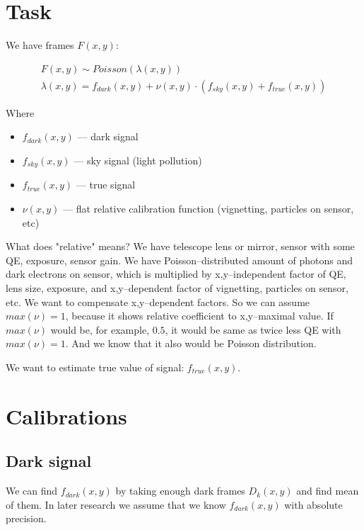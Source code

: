 \documentclass{article}
\begin{document}
\section{Task}

We have frames $F(x,y)$:

\begin{eqnarray}
    F(x,y) \sim Poisson\left( \lambda(x,y) \right) \\
    \lambda(x,y) = f_{dark}(x,y) + \nu(x,y) \cdot \left( f_{sky}(x,y) + f_{true}(x,y) \right)
\end{eqnarray}

Where 
\begin{itemize}
    \item $f_{dark}(x,y)$ --- dark signal
    \item $f_{sky}(x,y)$ --- sky signal (light pollution)
    \item $f_{true}(x,y)$ --- true signal
    \item $\nu(x,y)$ --- flat relative calibration function (vignetting, particles on sensor, etc)
\end{itemize}

What does "relative" means? We have telescope lens or mirror, sensor with some QE, exposure, sensor gain. We have Poisson--distributed amount
of photons and dark electrons on sensor, which is multiplied by x,y--independent factor of QE, lens size, exposure, and x,y--dependent factor
of vignetting, particles on sensor, etc. We want to compensate x,y--dependent factors. So we can assume $max(\nu) = 1$, because it shows
relative coefficient to x,y--maximal value. If $max(\nu)$ would be, for example, $0.5$, it would be same as twice less QE with $max(\nu) = 1$.
And we know that it also would be Poisson distribution.

We want to estimate true value of signal: $f_{true}(x,y)$.

\section{Calibrations}

\subsection{Dark signal}

We can find $f_{dark}(x,y)$ by taking enough dark frames $D_k(x,y)$ and find mean of them.
In later research we assume that we know $f_{dark}(x,y)$ with absolute precision.
\end{document}
